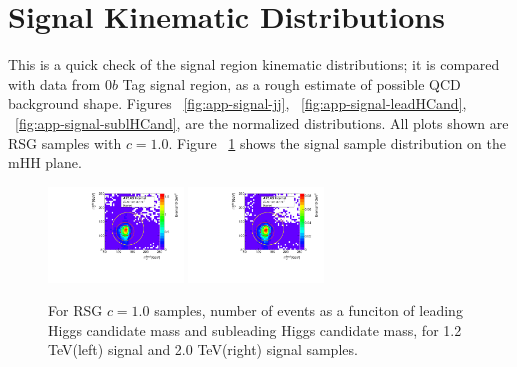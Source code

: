 \section{Signal Kinematic Distributions }
\label{app:signal-dist}

This is a quick check of the signal region kinematic distributions; it is compared with data from $0b$ Tag signal region, as a rough estimate of possible QCD background shape. Figures ~\ref{fig:app-signal-jj}, ~\ref{fig:app-signal-leadHCand}, ~\ref{fig:app-signal-sublHCand}, are the normalized distributions. All plots shown are RSG samples with $c=1.0$. Figure ~\ref{fig:app-signal-mhh} shows the signal sample distribution on the mHH plane.


\begin{figure}[htbp!]
\begin{center}
\includegraphics[width=0.32\textwidth,angle=-90]{figures/boosted/Truth/Sig_1200_AllTag_Incl_mH0H1.pdf}
\includegraphics[width=0.32\textwidth,angle=-90]{figures/boosted/Truth/Sig_2000_AllTag_Incl_mH0H1.pdf}
\caption{For RSG $c=1.0$ samples, number of events as a funciton of leading Higgs candidate mass and subleading Higgs candidate mass, for 1.2 TeV(left) signal and 2.0 TeV(right) signal samples.}
\label{fig:app-signal-mhh}
\end{center}
\end{figure}

